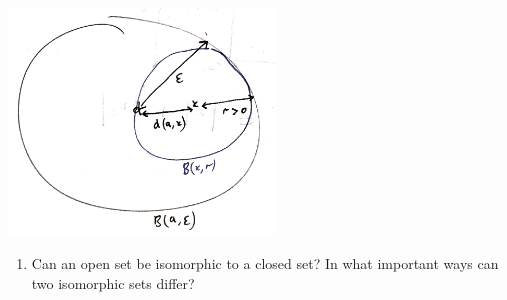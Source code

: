 \documentclass[12pt]{article}
\begin{document}
\begin{enumerate}
\begin{mdframed}
    \includegraphics[width=200pt]{img/questions-oxford-a2-ball-is-open-proof-diagram.png}
  \end{mdframed}
\end{enumerate}

\begin{enumerate}
\item Can an open set be isomorphic to a closed set? In what important ways can two isomorphic sets
  differ?
\end{enumerate}
\end{document}
